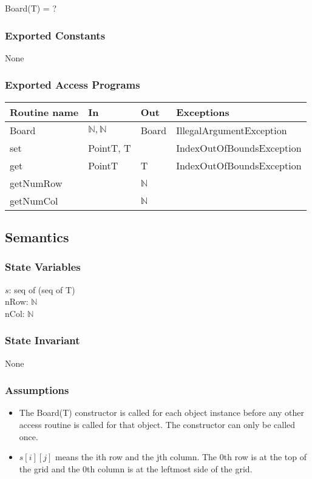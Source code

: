 \documentclass[12pt]{article}
\begin{document}
Board(T) = ?

\subsubsection* {Exported Constants}

None

\subsubsection* {Exported Access Programs}

\begin{tabular}{| l | l | l | p{6cm} |}
\hline
\textbf{Routine name} & \textbf{In} & \textbf{Out} & \textbf{Exceptions}\\
\hline
Board & $\mathbb{N},\mathbb{N}$ & Board & IllegalArgumentException\\
\hline
set & PointT, T & ~ & IndexOutOfBoundsException\\
\hline
get & PointT & T & IndexOutOfBoundsException\\
\hline
getNumRow & ~ & $\mathbb{N}$ & \\
\hline
getNumCol & ~ & $\mathbb{N}$ & \\
\hline
\end{tabular}

\subsection* {Semantics}

\subsubsection* {State Variables}

$s$: seq of (seq of T)\\
nRow: $\mathbb{N}$\\
nCol: $\mathbb{N}$

\subsubsection* {State Invariant}

None

\subsubsection* {Assumptions}

\begin{itemize}
\item The Board(T) constructor is called for each object instance before any
other access routine is called for that object.  The constructor can only be
called once.
\item $s[i][j]$ means the ith row and the jth column.  The 0th row is at the top of the grid and the 0th column is at the leftmost side of the grid.
\end{itemize}
\end{document}
